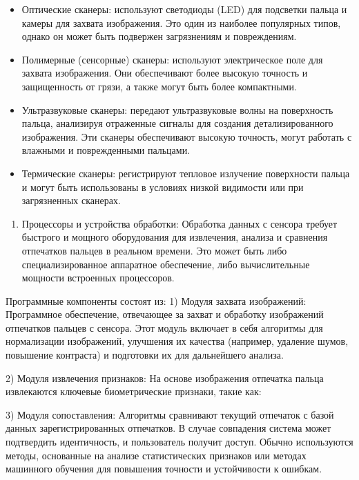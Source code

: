 \begin{multicols}{2}
\begin{itemize}
\item
  Оптические сканеры: используют светодиоды (LED) для подсветки пальца и
  камеры для захвата изображения. Это один из наиболее популярных типов,
  однако он может быть подвержен загрязнениям и повреждениям.
\item
  Полимерные (сенсорные) сканеры: используют электрическое поле для
  захвата изображения. Они обеспечивают более высокую точность и
  защищенность от грязи, а также могут быть более компактными.
\item
  Ультразвуковые сканеры: передают ультразвуковые волны на поверхность
  пальца, анализируя отраженные сигналы для создания детализированного
  изображения. Эти сканеры обеспечивают высокую точность, могут работать
  с влажными и поврежденными пальцами.
\item
  Термические сканеры: регистрируют тепловое излучение поверхности
  пальца и могут быть использованы в условиях низкой видимости или при
  загрязненных сканерах.
\end{itemize}

\begin{enumerate}
\def\labelenumi{\arabic{enumi}.}
\item
  Процессоры и устройства обработки: Обработка данных с сенсора требует
  быстрого и мощного оборудования для извлечения, анализа и сравнения
  отпечатков пальцев в реальном времени. Это может быть либо
  специализированное аппаратное обеспечение, либо вычислительные
  мощности встроенных процессоров.
\end{enumerate}

Программные компоненты состоят из: 1) Модуля захвата изображений:
Программное обеспечение, отвечающее за захват и обработку изображений
отпечатков пальцев с сенсора. Этот модуль включает в себя алгоритмы для
нормализации изображений, улучшения их качества (например, удаление
шумов, повышение контраста) и подготовки их для дальнейшего анализа.

2) Модуля извлечения признаков: На основе изображения отпечатка пальца
извлекаются ключевые биометрические признаки, такие как:

3) Модуля сопоставления: Алгоритмы сравнивают текущий отпечаток с базой
данных зарегистрированных отпечатков. В случае совпадения система может
подтвердить идентичность, и пользователь получит доступ. Обычно
используются методы, основанные на анализе статистических признаков или
методах машинного обучения для повышения точности и устойчивости к
ошибкам.


\end{multicols}
